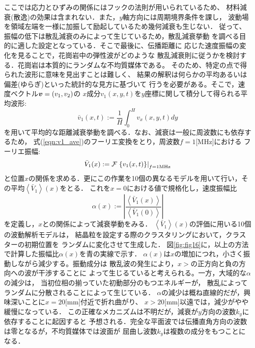 ここでは応力とひずみの関係にはフックの法則が用いられているため、
材料減衰(散逸)の効果は含まれない．また，$y$軸方向には周期境界条件を課し，
波動場を領域左端を一様に加振して励起しているため幾何減衰も生じない．
従って、振幅の低下は散乱減衰のみによって生じているため，散乱減衰挙動
を調べる目的に適した設定となっている．そこで最後に、伝播距離に
応じた速度振幅の変化を見ることで，花崗岩中の弾性波がどのような
散乱減衰則に従うかを検討する．花崗岩は本質的にランダムな不均質媒体である。
そのため、特定の点で得られた波形に意味を見出すことは難しく、
結果の解釈は何らかの平均あるいは偏差(ゆらぎ)といった統計的な見方に基づいて
行うを必要がある。そこで，速度ベクトル$\mbox{\boldmath{$v$}}=(v_1,v_2)$の
$x$成分$v_1(x,y,t)$を$y$座標に関して積分して得られる平均波形:
\begin{equation}
	\bar v_1(x,t):=\frac{1}{H}\int_0^Hv_x(x,y,t)dy
	\label{eqn:v1_ave}
\end{equation}
を用いて平均的な距離減衰挙動を調べる．なお、減衰は一般に周波数にも依存するため，
式(\ref{eqn:v1_ave})のフーリエ変換をとり，周波数$f=1$[MHz]における
フーリエ振幅:
\begin{equation}
	\bar V_1(x):={\cal F} \left. \left\{ v_1(x,t)\right\} \right|_{f=1{\rm MHz}} 
	\label{eqn:}
\end{equation}
と位置$x$の関係を求める．更にこの作業を10個の異なるモデルを用いて行い，その平均$\left< \bar V_1 \right>(x)$をとる．
これを$x=0$における値で規格化し，速度振幅比
\begin{equation}
	\alpha(x) := 
	\left|
	\frac
	{ \left< \bar V_1(x) \right>}
	{ \left< \bar V_1(0) \right>}
	\right|
	\label{eqn:decay_x}
\end{equation}
を定義し，$x$との関係によって減衰挙動をみる．
$\left<\bar V_1\right>(x)$の評価に用いる10個の波動解析モデルは，
結晶粒を設定する際のクラスタリングにおいて，クラスターの初期位置を
ランダムに変化させて生成した．
図\ref{fig:fig16}に，以上の方法で計算した振幅比$\alpha(x)$を青の実線で示す．
$\alpha(x)$は$x$の増加につれ，小さく振動しながら減少する。振動成分は
散乱波の発生により，$x>$の正方向と負の方向への波が干渉することに
よって生じるていると考えられる。一方，大域的な$\alpha$の減少は，
当初位相の揃っていた初動部分のもつエネルギーが，
散乱によってランダムに分散されることによって生じている．
$\alpha$の減少は概ね直線的だが，興味深いことに$x=20$[mm]付近で折れ曲がり、
$x>20$[mm]以遠では，減少がやや緩慢になっている．
この正確なメカニズムは不明だが，減衰が$y$方向の波数$k_y$に依存することに起因すると
予想される．完全な平面波では伝播直角方向の波数は零となるが，不均質媒体では波面が
屈曲し波数$k_y$は複数の成分をもつことになる．
